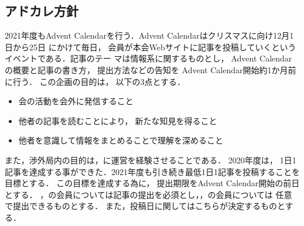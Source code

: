 \subsection*{アドカレ方針}


2021年度もAdvent Calendarを行う．Advent Calendarはクリスマスに向け12月1日から25日
にかけて毎日，会員が本会Webサイトに記事を投稿していくというイベントである．記事のテー
マは情報系に関するものとし，Advent Calendarの概要と記事の書き方，提出方法などの告知を
Advent Calendar開始約1か月前に行う．
この企画の目的は，以下の3点とする．
\begin{itemize}
    \item 会の活動を会外に発信すること
    \item 他者の記事を読むことにより，新たな知見を得ること
    \item 他者を意識して情報をまとめることで理解を深めること
\end{itemize}
また，渉外局内の目的は，\firstGrade{}に運営を経験させることである．
2020年度は，1日1記事を達成する事ができた．2021年度も引き続き最低1日1記事を投稿することを目標とする．
この目標を達成する為に，提出期限をAdvent Calendar開始の前日とする．
\firstGrade{}，\secondGrade{}の会員については記事の提出を必須とし，\thirdGrade{}，\fourthGrade{}の会員については
任意で提出できるものとする．
また，投稿日に関してはこちらが決定するものとする．
